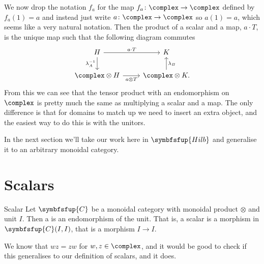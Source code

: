 \documentclass[fleqn]{NotesClass}
\makeatletter
\newcommand{\cat}[1]{\symbfsfup{#1}}
\newcommand{\c@egory}[1]{\symbfsfup{#1}}
\newcommand{\Hilb}{\c@egory{Hilb}}
\makeatother
\begin{document}
    We now drop the notation \(f_a\) for the map \(f_a \colon \complex \to \complex\) defined by \(f_a(1) = a\) and instead just write \(a \colon \complex \to \complex\) so \(a(1) = a\), which seems like a very natural notation.
    Then the product of a scalar and a map, \(a \cdot T\), is the unique map such that the following diagram commutes
    \begin{equation}
        \begin{tikzcd}
            H \arrow[r, "a \cdot T"] \arrow[d, "\lambda_A^{-1}"'] & K\\
            \complex \otimes H \arrow[r, "a \otimes T"'] & \complex \otimes K. \arrow[u, "\lambda_B"']
        \end{tikzcd}
    \end{equation}
    From this we can see that the tensor product with an endomorphism on \(\complex\) is pretty much the same as multiplying a scalar and a map.
    The only difference is that for domains to match up we need to insert an extra object, and the easiest way to do this is with the unitors.
    
    In the next section we'll take our work here in \(\Hilb\) and generalise it to an arbitrary monoidal category.
    
    \section{Scalars}
    \begin{dfn}{Scalar}{}
        Let \(\cat{C}\) be a monoidal category with monoidal product \(\otimes\) and unit \(I\).
        Then a  is an endomorphism of the unit.
        That is, a scalar is a morphism in \(\cat{C}(I, I)\), that is a morphism \(I \to I\).
    \end{dfn}
    
    We know that \(wz = zw\) for \(w, z \in \complex\), and it would be good to check if this generalises to our definition of scalars, and it does.
    
\end{document}
